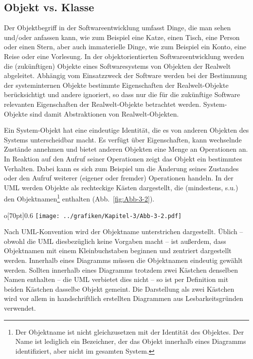 \subsection{Objekt vs. Klasse}

Der Objektbegriff in der Softwareentwicklung umfasst Dinge, die man sehen und/oder anfassen kann, wie zum Beispiel eine Katze, einen Tisch, eine Person oder einen Stern, aber auch immaterielle Dinge, wie zum Beispiel ein Konto, eine Reise oder eine Vorlesung. In der objektorientierten Softwareentwicklung werden die (zukünftigen) Objekte eines Softwaresystems von Objekten der Realwelt abgeleitet. Abhängig vom Einsatzzweck der Software werden bei der Bestimmung der systeminternen Objekte bestimmte Eigenschaften der Realwelt-Objekte berücksichtigt und andere ignoriert, so dass nur die für die zukünftige Software relevanten Eigenschaften der Realwelt-Objekte betrachtet werden. System-Objekte sind damit Abstraktionen von Realwelt-Objekten.

Ein System-Objekt hat eine eindeutige Identität, die es von anderen Objekten des Systems unterscheidbar macht. Es verfügt über Eigenschaften, kann wechselnde Zustände annehmen und bietet anderen Objekten eine Menge an Operationen an. In Reaktion auf den Aufruf seiner Operationen zeigt das Objekt ein bestimmtes Verhalten. Dabei kann es sich zum Beispiel um die Änderung seines Zustandes oder den Aufruf weiterer (eigener oder fremder) Operationen handeln. In der UML werden Objekte als rechteckige Kästen dargestellt, die (mindestens, s.u.) den Objektnamen\footnote{Der Objektname ist nicht gleichzusetzen mit der Identität des Objektes. Der Name ist lediglich ein Bezeichner, der das Objekt innerhalb eines Diagramms identifiziert, aber nicht im gesamten System.} enthalten (Abb.~\ref{fig:Abb-3-2}).
\begin{wrapfigure}{o}[70pt]{0.6\textwidth}
	\centering 
	\texttt{[image: ../grafiken/Kapitel-3/Abb-3-2.pdf]}
	\caption{Ein Objekt in UML-Darstellung}
	\label{fig:Abb-3-2}
	\vspace{-6pt}
\end{wrapfigure}
Nach UML-Konvention wird der Objektname unterstrichen dargestellt. Üblich – obwohl die UML diesbezüglich keine Vorgaben macht – ist außerdem, dass Objektnamen mit einem Kleinbuchstaben beginnen und zentriert dargestellt werden. Innerhalb eines Diagramms müssen die Objektnamen eindeutig gewählt werden. Sollten innerhalb eines Diagramms trotzdem zwei Kästchen denselben Namen enthalten – die UML verbietet dies nicht – so ist per Definition mit beiden Kästchen dasselbe Objekt gemeint. Die Darstellung als zwei Kästchen wird vor allem in handschriftlich erstellten Diagrammen aus Lesbarkeitsgründen verwendet.


